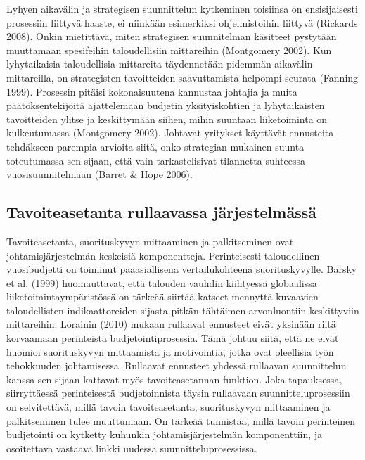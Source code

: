\documentclass[12pt,a4paper,oneside,pdftex]{report}
\begin{document}
Lyhyen aikavälin ja strategisen suunnittelun kytkeminen toisiinsa on ensisijaisesti prosessiin liittyvä haaste, ei niinkään esimerkiksi ohjelmistoihin liittyvä (Rickards 2008). Onkin mietittävä, miten strategisen suunnitelman käsitteet pystytään muuttamaan spesifeihin taloudellisiin mittareihin (Montgomery 2002). Kun lyhytaikaisia taloudellisia mittareita täydennetään pidemmän aikavälin mittareilla, on strategisten tavoitteiden saavuttamista helpompi seurata (Fanning 1999). Prosessin pitäisi kokonaisuutena kannustaa johtajia ja muita päätöksentekijöitä ajattelemaan budjetin yksityiskohtien ja lyhytaikaisten tavoitteiden ylitse ja keskittymään siihen, mihin suuntaan liiketoiminta on kulkeutumassa (Montgomery 2002). Johtavat yritykset käyttävät ennusteita tehdäkseen parempia arvioita siitä, onko strategian mukainen suunta toteutumassa sen sijaan, että vain tarkastelisivat tilannetta suhteessa vuosisuunnitelmaan (Barret & Hope 2006).

\subsection{Tavoiteasetanta rullaavassa järjestelmässä}

Tavoiteasetanta, suorituskyvyn mittaaminen ja palkitseminen ovat johtamisjärjestelmän keskeisiä komponentteja. Perinteisesti taloudellinen vuosibudjetti on toiminut pääasiallisena vertailukohteena suorituskyvylle. Barsky et al. (1999) huomauttavat, että talouden vauhdin kiihtyessä globaalissa liiketoimintaympäristössä on tärkeää siirtää katseet mennyttä kuvaavien taloudellisten indikaattoreiden sijasta pitkän tähtäimen arvonluontiin keskittyviin mittareihin. Lorainin (2010) mukaan rullaavat ennusteet eivät yksinään riitä korvaamaan perinteistä budjetointiprosessia. Tämä johtuu siitä, että ne eivät huomioi suorituskyvyn mittaamista ja motivointia, jotka ovat oleellisia työn tehokkuuden johtamisessa. Rullaavat ennusteet yhdessä rullaavan suunnittelun kanssa sen sijaan kattavat myös tavoiteasetannan funktion. Joka tapauksessa, siirryttäessä perinteisestä budjetoinnista täysin rullaavaan suunnitteluprosessiin on selvitettävä, millä tavoin tavoiteasetanta, suorituskyvyn mittaaminen ja palkitseminen tulee muuttumaan. On tärkeää tunnistaa, millä tavoin perinteinen budjetointi on kytketty kuhunkin johtamisjärjestelmän komponenttiin, ja osoitettava vastaava linkki uudessa suunnitteluprosessissa.
\end{document}
